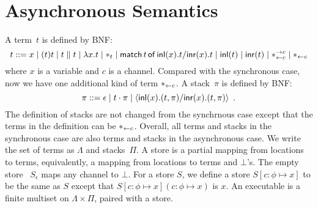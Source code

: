 \section{Asynchronous Semantics}
\label{sec:async}

A term~$t$ is defined by BNF:
\[
 t::= x
 \mid (t)t
 \mid t\parallel t
 \mid \lambda x.t
 \mid \ast_t
 \mid \mathsf{match}\,{t}\,\mathsf{of}\, \mathsf{inl}({x}). {t}/ \mathsf{inr}({x}). {t}
 \mid \mathsf{inl}({t})
 \mid \mathsf{inr}({t})
 \mid \ast^{\rightarrow {c}}_{\leftarrow{c}}
 \mid \ast_{\leftarrow{c}}
\]
where $x$ is a variable and $c$ is a channel.
Compared with the synchronous case, now we have one additional kind of term
$\ast_{\leftarrow{c}}$.
A stack~$\pi$ is defined by BNF:
\[
 \pi ::= \epsilon
 \mid t\cdot \pi
 \mid \langle \mathsf{inl}({x}). ({t},{\pi})/ \mathsf{inr}({x}). ({t},{\pi})\rangle
 \enspace.
\]
The definition of stacks are not changed from the synchrnous case except
that the terms in the definition can be $\ast_{\leftarrow{c}}$.
Overall, all terms and stacks in the synchronous case are also terms and
stacks in the asynchronous case.
We write the set of terms as $\Lambda$ and stacks~$\Pi$.
A store is a partial mapping from locations to
terms, equivalently, a mapping from locations to terms and $\bot$'s.
The empty store%
~$S_\epsilon$ maps any channel to $\bot$.
For a store $S$, we define a store $S[c\colon\phi\mapsto x]$ to be
the same as $S$ except that $S[c\colon\phi\mapsto x](c\colon\phi\mapsto
x)$ is $x$.
An executable is a finite multiset on $\Lambda \times \Pi$,
paired with a store.

